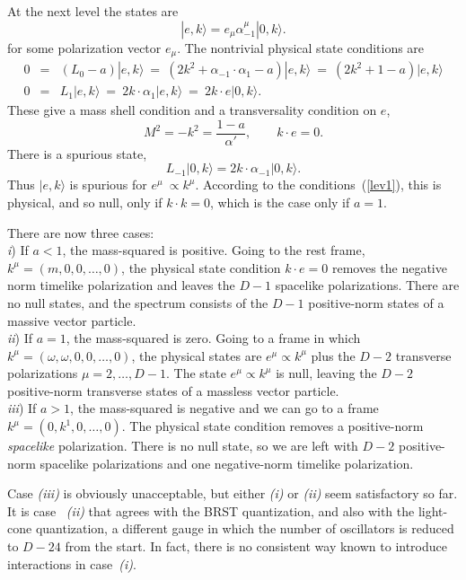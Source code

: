 At the next level the states are 
\begin{equation}
|e,k\rangle = e_\mu \alpha^\mu_{-1} |0,k\rangle.
\end{equation}
for some polarization vector $e_\mu$.
The nontrivial physical state conditions are
\begin{eqnarray}
0&=& (L_0-a)|e,k\rangle \ =\ (2k^2 + \alpha_{-1}\cdot\alpha_1 - a)
|e,k\rangle\ =\ (2k^2 + 1 - a)|e,k\rangle \nonumber\\
0&=& L_1|e,k\rangle \ =\ 2k \cdot \alpha_1
|e,k\rangle\ =\ 2k \cdot e |0,k\rangle.
\end{eqnarray}
These give a mass shell condition and a transversality condition
on $e$,
\begin{equation}
M^2 = -k^2 = \frac{1-a}{\alpha'},\qquad
k \cdot e = 0. \label{lev1}
\end{equation}
There is a spurious state,
\begin{equation}
L_{-1} |0,k\rangle = 2k \cdot \alpha_{-1} |0,k\rangle.
\end{equation}
Thus $|e,k\rangle$ is spurious for $e^\mu \ \propto k^\mu$. 
According to the conditions~(\ref{lev1}), this is physical, and so
null, only if
$k \cdot k = 0$, which is the case only if $a = 1$.

There are now three cases:\\[3pt]
{\it i}) If $a < 1$, the mass-squared is positive.  Going to the
rest frame, $k^\mu = (m,0,0,\ldots,0)$, the physical state
condition $k \cdot e = 0$ removes the negative norm timelike
polarization and leaves the $D-1$ spacelike polarizations.  There are
no null states, and the spectrum consists of the
$D-1$ positive-norm states of a massive vector particle.\\[3pt]
{\it ii}) If $a = 1$, the mass-squared is zero.
Going to a frame in which
$k^\mu = (\omega,\omega,0,0,\ldots,0)$, the physical
states are $e^\mu \propto k^\mu$ plus the $D-2$ transverse
polarizations $\mu = 2, \ldots, D-1$.  The state $e^\mu \propto k^\mu$
is null,
leaving the $D-2$ positive-norm transverse states of a massless vector
particle.\\[3pt]
{\it iii}) If $a > 1$, the mass-squared is
negative and we can go to a frame $k^\mu = (0,k^1,0,\ldots,0)$. 
The physical state condition
removes a positive-norm {\it spacelike} polarization.  There is
no null state, so we are left
with $D-2$ positive-norm spacelike polarizations and
one negative-norm timelike polarization.

Case {\it (iii)} is obviously unacceptable, but either {\it (i)}
or {\it (ii)} seem satisfactory so far.  It is case~{\it
(ii)} that agrees with the BRST quantization, and also with the
light-cone quantization, a different gauge in which the number of
oscillators is reduced to $D-24$ from the start.  In fact, there
is no consistent way known to introduce interactions in
case~{\it (i)}.

